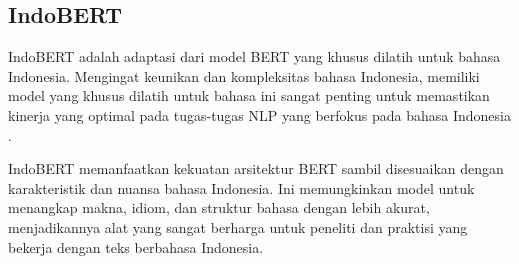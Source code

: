 \subsection{IndoBERT}

IndoBERT adalah adaptasi dari model BERT yang khusus dilatih untuk bahasa Indonesia. Mengingat keunikan dan kompleksitas bahasa Indonesia, memiliki model yang khusus dilatih untuk bahasa ini sangat penting untuk memastikan kinerja yang optimal pada tugas-tugas NLP yang berfokus pada bahasa Indonesia \parencite{indobert}.

IndoBERT memanfaatkan kekuatan arsitektur BERT sambil disesuaikan dengan karakteristik dan nuansa bahasa Indonesia. Ini memungkinkan model untuk menangkap makna, idiom, dan struktur bahasa dengan lebih akurat, menjadikannya alat yang sangat berharga untuk peneliti dan praktisi yang bekerja dengan teks berbahasa Indonesia.

